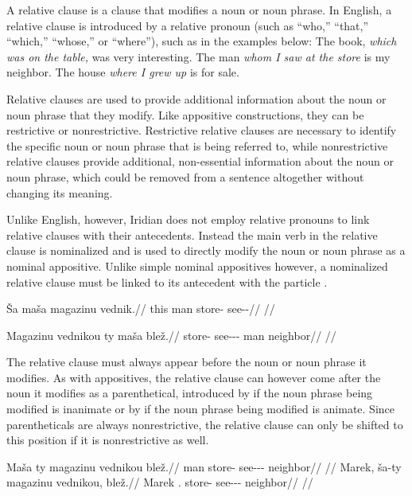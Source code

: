 A relative clause is a clause that modifies a noun or
noun phrase. In English, a relative clause is introduced by a
relative pronoun (such as ``who,'' ``that,'' ``which,'' ``whose,'' or
``where''), such as in the examples below:
\pex
  \a The book, \emph{which was on the table,} was very interesting.
  \a The man \emph{whom I saw at the store} is my neighbor.
  \a The house \emph{where I grew up} is for sale.
\xe

Relative clauses are used to provide additional information about the noun or
noun phrase that they modify. Like appositive constructions, they can be
restrictive or nonrestrictive. Restrictive relative clauses are necessary to
identify the specific noun or noun phrase that is being referred to, while
nonrestrictive relative clauses provide additional, non-essential information
about the noun or noun phrase, which could be removed from a sentence altogether
without changing its meaning.

Unlike English, however, Iridian does not employ relative pronouns to link
relative clauses with their antecedents. Instead the main verb in the relative
clause is nominalized and is used to directly modify the noun or noun phrase as
a nominal appositive. Unlike simple nominal appositives however, a nominalized
relative clause must be linked to its antecedent with the particle . 

\pex
\a\begingl
  \gla Ša maša magazinu vednik.//
  \glb this man store-\Ins{} see-\Pv{}-\Pf{}//
  \glft {}//
\endgl

\a\begingl
  \gla Magazinu vednikou ty maša blež.//
  \glb store-\Ins{} see-\Pv{}-\Pf{}-\Nz{} \Lnk{} man neighbor//
  \glft {}//
\endgl
\xe

The relative clause must always appear before the noun or noun phrase it
modifies. As with appositives, the relative clause can however come after the
noun it modifies as a parenthetical, introduced by  if the noun
phrase being modified is inanimate or by  if the noun phrase being
modified is animate. Since parentheticals are always nonrestrictive, the
relative clause can only be shifted to this position if it is nonrestrictive as
well.

\pex
\a\begingl
  \gla \ljudge{*}Maša ty magazinu vednikou blež.//
  \glb man \Lnk{} store-\Ins{} see-\Pv{}-\Pf{}-\Nz{} neighbor//
  \glft {}//
\endgl
\a\begingl
  \gla Marek, ša-ty magazinu vednikou, blež.//
  \glb Marek \Anim{}.\Lnk{} store-\Ins{} see-\Pv{}-\Pf{}-\Nz{} neighbor//
  \glft {}//
\endgl
\xe

